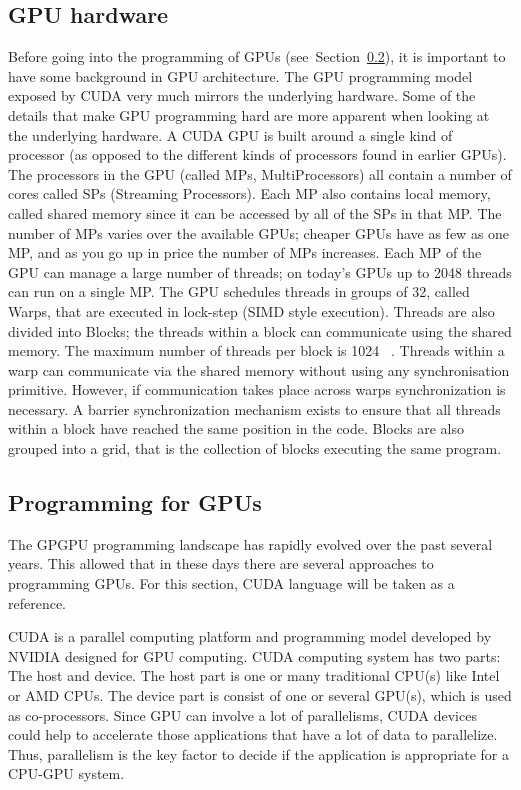 \documentclass[Ingles]{ic-tese-v1}
\newcommand{\rsec}[1]{Section~\ref{sec:#1}}
\begin{document}
\subsection{GPU hardware}
\label{sec:gpugardware}
Before going into the programming of GPUs (see~\rsec{gpuprogramming}), it is important to have some background in GPU architecture.
The GPU programming model exposed by CUDA very much mirrors the underlying
hardware. Some of the details that make GPU programming hard are more apparent
when looking at the underlying hardware.
A CUDA GPU is built around a single kind of processor (as opposed to the different
kinds of processors found in earlier GPUs). The processors in the GPU (called
MPs, MultiProcessors) all contain a number of cores called SPs (Streaming Processors).
Each MP also contains local memory, called shared memory since it can be
accessed by all of the SPs in that MP. The number of MPs varies over the available
GPUs; cheaper GPUs have as few as one MP, and as you go up in price the number
of MPs increases.
Each MP of the GPU can manage a large number of threads; on today’s GPUs
up to 2048 threads can run on a single MP. The GPU schedules threads in groups
of 32, called Warps, that are executed in lock-step (SIMD style execution). Threads are also divided into Blocks; the threads within a block can communicate using the
shared memory. The maximum number of threads per block is 1024 ~\cite{NvidiaGuide2018}. Threads within
a warp can communicate via the shared memory without using any synchronisation
primitive. However, if communication takes place across warps synchronization is
necessary. A barrier synchronization mechanism exists to ensure that all threads
within a block have reached the same position in the code. Blocks are also grouped
into a grid, that is the collection of blocks executing the same program.

\subsection{Programming for GPUs}
\label{sec:gpuprogramming}
The GPGPU programming landscape has rapidly evolved over the past several years. This allowed that in these days there are several approaches to programming GPUs. For this section, CUDA language will be taken as a reference.

CUDA is a parallel computing platform and programming model developed by NVIDIA designed for GPU computing.
CUDA computing system has two parts: The host and device.
The host part is one or many traditional CPU(s) like Intel or AMD CPUs. The
device part is consist of one or several GPU(s), which is used as co-processors. Since
GPU can involve a lot of parallelisms, CUDA devices could help to accelerate those applications that have a lot of data to  parallelize. Thus, parallelism is the key factor to decide if the application is appropriate for a CPU-GPU system.
\end{document}
